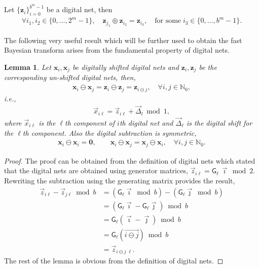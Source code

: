 \documentclass{iitthesis}          %
\newcommand{\bm}[1]{\boldsymbol{#1}}
\newcommand{\naturals}{\mathbb{N}}
\newcommand{\vx}{\bm{x}}
\newcommand{\vz}{\bm{z}}
\newcommand{\mG}{\mathsf{G}}
\newtheorem{lemma}[theorem]{Lemma}
\begin{document}
Let $\{\vz_i\}_{i=0}^{b^m-1}$ be a digital net, then
\begin{align*}
\forall i_1, i_2 \in \{0,\dots,2^m-1\}, \quad \vz_{j_1} \oplus \vz_{i_2} = \vz_{i_3}, \quad \text{for some} \; i_3 \in \{0,\dots,b^m-1\}.
\end{align*}

The following very useful result which will be further used to obtain the fast Bayesian transform arises from the fundamental property of digital nets.

\begin{lemma}
\label{lemma:digital_net_prop}
Let $\vx_i, \vx_j$ be digitally shifted digital nets and $\vz_i, \vz_j$ be the corresponding un-shifted digital nets, then,
\begin{align}
\label{eqn:digital_shift_prop}
\vx_i \ominus \vx_j = \vz_i \ominus \vz_j = \vz_{i \ominus j}, \quad \forall i,j \in \naturals_0,
\end{align}
i.e., 
\begin{align*}
\vec{x}_{i \ell} = \vec{z}_{i \ell} + \vec{\Delta}_l \bmod 1,
\end{align*}
where $\vec{x}_{i \ell}$ is the $\ell$th component of $i$th digital net and $\vec{\Delta}_{\ell}$ is the digital shift for the $\ell$th component. Also the digital subtraction is symmetric,
\begin{align}
\label{eqn:digital_net_symmetric_prop}
\vx_i \ominus \vx_i = \boldsymbol{ 0}, \qquad 
\vx_i \ominus \vx_j = \vx_j \ominus \vx_i, \quad \forall i,j \in \naturals_0.
\end{align}
\end{lemma}

\begin{proof}

The proof can be obtained from the definition of digital nets which stated that the digital nets are obtained using generator matrices, $\vec{z}_{i \ell} = \mG_{\ell} \, \vec{\imath} \bmod 2$. Rewriting the subtraction using the generating matrix provides the result,
\begin{align*}
\vec{z}_{i \ell} - \vec{z}_{j\ell} \bmod b & = (\mG_{\ell} \vec{\imath} \bmod b) - (\mG_{\ell} \vec{\jmath} \bmod b) \\
& = (\mG_{\ell} \vec{\imath} - \mG_{\ell} \vec{\jmath} ) \bmod b \\
& = \mG_{\ell} (\vec{\imath} - \vec{\jmath} ) \bmod b \\
& = \mG_{\ell} (\overrightarrow{i \ominus j} ) \bmod b \\
& = \vec{z}_{i \ominus j \; {\ell}}.
\end{align*}
The rest of the lemma is obvious from the definition of digital nets.
\end{proof}
\end{document}
